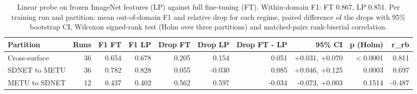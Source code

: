 \begin{table}[htbp]
\centering
\caption{Linear probe on frozen ImageNet features (LP) against full fine-tuning (FT). Within-domain F1: FT 0.867, LP 0.851. Per training run and partition: mean out-of-domain F1 and relative drop for each regime, paired difference of the drops with 95\% bootstrap CI, Wilcoxon signed-rank test (Holm over three partitions) and matched-pairs rank-biserial correlation.}
\label{tab:sonda}
\begin{tabular}{lrrrrrrrrr}
\toprule
Partition & Runs & F1 FT & F1 LP & Drop FT & Drop LP & Drop FT - LP & 95\% CI & p (Holm) & r\_rb \\
\midrule
Cross-surface & 36 & 0.654 & 0.678 & 0.205 & 0.154 & 0.051 & +0.031, +0.070 & $<$0.0001 & 0.811 \\
SDNET to METU & 36 & 0.782 & 0.828 & 0.055 & -0.030 & 0.085 & +0.046, +0.125 & 0.0003 & 0.697 \\
METU to SDNET & 12 & 0.437 & 0.402 & 0.562 & 0.597 & -0.034 & -0.073, +0.003 & 0.1514 & -0.487 \\
\bottomrule
\end{tabular}
\end{table}
